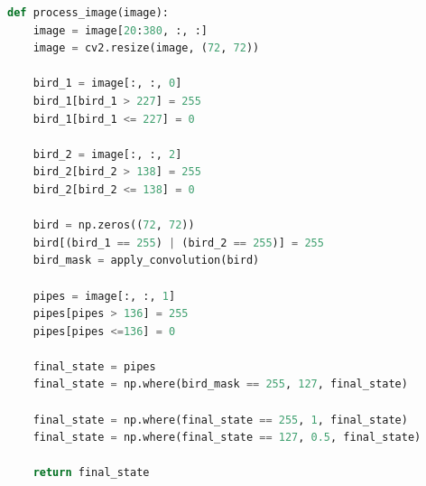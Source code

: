 \documentclass[a4paper,12pt]{article}
\begin{document}
\begin{lstlisting}[language=Python, caption=Image Preprocessing]
def process_image(image):
    image = image[20:380, :, :]
    image = cv2.resize(image, (72, 72))

    bird_1 = image[:, :, 0]
    bird_1[bird_1 > 227] = 255
    bird_1[bird_1 <= 227] = 0

    bird_2 = image[:, :, 2]
    bird_2[bird_2 > 138] = 255
    bird_2[bird_2 <= 138] = 0

    bird = np.zeros((72, 72))
    bird[(bird_1 == 255) | (bird_2 == 255)] = 255
    bird_mask = apply_convolution(bird)

    pipes = image[:, :, 1]
    pipes[pipes > 136] = 255
    pipes[pipes <=136] = 0

    final_state = pipes
    final_state = np.where(bird_mask == 255, 127, final_state)

    final_state = np.where(final_state == 255, 1, final_state)
    final_state = np.where(final_state == 127, 0.5, final_state)

    return final_state
\end{lstlisting}
\end{document}
